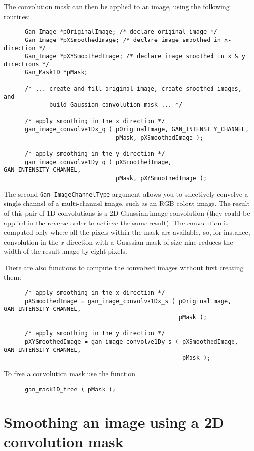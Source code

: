 The convolution mask can then be applied to an image, using the
following routines:
\begin{verbatim}
      Gan_Image *pOriginalImage; /* declare original image */
      Gan_Image *pXSmoothedImage; /* declare image smoothed in x-direction */
      Gan_Image *pXYSmoothedImage; /* declare image smoothed in x & y directions */
      Gan_Mask1D *pMask;

      /* ... create and fill original image, create smoothed images, and
             build Gaussian convolution mask ... */

      /* apply smoothing in the x direction */
      gan_image_convolve1Dx_q ( pOriginalImage, GAN_INTENSITY_CHANNEL,
                                pMask, pXSmoothedImage );

      /* apply smoothing in the y direction */
      gan_image_convolve1Dy_q ( pXSmoothedImage, GAN_INTENSITY_CHANNEL,
                                pMask, pXYSmoothedImage );
\end{verbatim}
The second {\tt Gan\_ImageChannelType} argument allows you to selectively
convolve a single channel of a multi-channel image,
such as an RGB colout image.
The result of this pair of 1D convolutions is a 2D Gaussian image convolution
(they could be applied in the reverse order to achieve the same result).
The convolution is computed only where all the pixels within the mask
are available, so, for instance, convolution in the $x$-direction with
a Gaussian mask of size nine reduces the width of the result image by eight
pixels.

There are also functions to compute the convolved images without first
creating them:
\begin{verbatim}
      /* apply smoothing in the x direction */
      pXSmoothedImage = gan_image_convolve1Dx_s ( pOriginalImage, GAN_INTENSITY_CHANNEL,
                                                  pMask );

      /* apply smoothing in the y direction */
      pXYSmoothedImage = gan_image_convolve1Dy_s ( pXSmoothedImage, GAN_INTENSITY_CHANNEL,
                                                   pMask );
\end{verbatim}
To free a convolution mask use the function
\begin{verbatim}
      gan_mask1D_free ( pMask );
\end{verbatim}



  \section{Smoothing an image using a 2D convolution mask }

